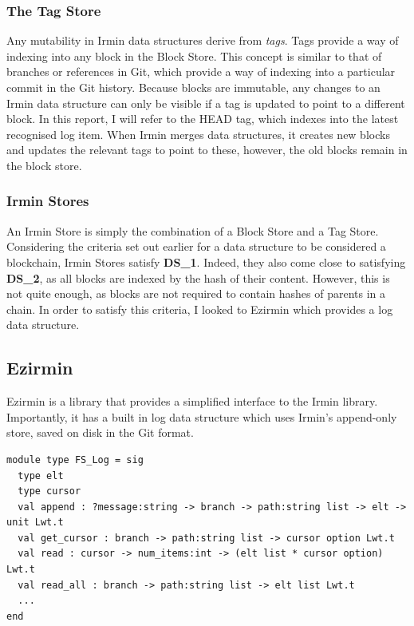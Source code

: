 \documentclass[12pt,a4paper,twoside,openright]{report}
\begin{document}
	\subsubsection*{The Tag Store}
	Any mutability in Irmin data structures derive from \textit{tags}.
	Tags provide a way of indexing into any block in the Block Store.
	This concept is similar to that of branches or references in Git, which provide a way of indexing into a particular commit in the Git history.
	Because blocks are immutable, any changes to an Irmin data structure can only be visible if a tag is updated to point to a different block. 
	In this report, I will refer to the HEAD tag, which indexes into the latest recognised log item.
	When Irmin merges data structures, it creates new blocks and updates the relevant tags to point to these, however, the old blocks remain in the block store.
	\subsubsection*{Irmin Stores}
	An Irmin Store is simply the combination of a Block Store and a Tag Store.
	Considering the criteria set out earlier for a data structure to be considered a blockchain, Irmin Stores satisfy \textbf{DS\_1}.
	Indeed, they also come close to satisfying \textbf{DS\_2}, as all blocks are indexed by the hash of their content. 
	However, this is not quite enough, as blocks are not required to contain hashes of parents in a chain.
	In order to satisfy this criteria, I looked to Ezirmin which provides a log data structure.

	\subsection{Ezirmin}
	Ezirmin is a library that provides a simplified interface to the Irmin library. 
	Importantly, it has a built in log data structure which uses Irmin's append-only store, saved on disk in the Git format. \\

	\begin{lstlisting}[caption={Ezirmin Log},label={lst:ezirminlog}]
module type FS_Log = sig
  type elt 
  type cursor 
  val append : ?message:string -> branch -> path:string list -> elt -> unit Lwt.t
  val get_cursor : branch -> path:string list -> cursor option Lwt.t
  val read : cursor -> num_items:int -> (elt list * cursor option) Lwt.t
  val read_all : branch -> path:string list -> elt list Lwt.t
  ...
end
	\end{lstlisting}
\end{document}
